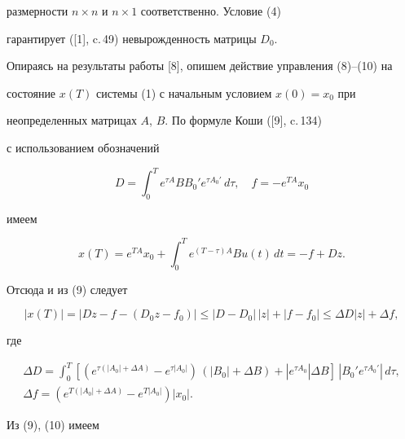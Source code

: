размерности $n \times n$ и $n \times 1$ соответственно. Условие (4)


гарантирует ([1], c.\,49) невырожденность матрицы $D_0$.





Опираясь на результаты работы [8], опишем действие управления (8)--(10) на


состояние $x(T)$ системы (1) с начальным условием $x(0)=x_0$ при


неопределенных матрицах $A$, $B$. По формуле Коши ([9], c.\,134)


с использованием обозначений


\begin{equation}


D = \int_0^T e^{\tau A}B B_0'e^{\tau A_0'} \, d \tau,


\quad f = - e^{T A}x_0


\end{equation}


имеем


$$


x(T)= e^{TA}x_0+\int_0^T e^{(T-\tau)A}B u(t) \, dt= -f+Dz.


$$


Отсюда и из (9) следует


\begin{equation}


|x(T)|=|Dz-f-(D_0z-f_0)| \le |D-D_0|\,|z|+|f-f_0| \le \Delta D |z|+\Delta f,


\end{equation}


где


\begin{gather}


\Delta D = \int_{0}^{T}


[(e^{ \tau ( |A_0|+\Delta A ) } -e^{\tau |A_0|})\,


( |B_0|+\Delta B )+| e^{ \tau A_0 } | \Delta B]


\, |B_0' e^{ \tau A_0' }| \, d\tau, \\


\Delta f =


( e^{ T(|A_0|+\Delta A)} - e^{T|A_0|}) |x_0|.


\end{gather} 





Из (9), (10) имеем


$$


